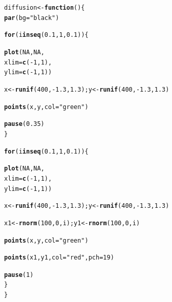 \documentclass[11pt, a4paper]{article}\usepackage[]{graphicx}\usepackage[]{xcolor}
\makeatletter
\newcommand{\hlnum}[1]{\textcolor[rgb]{0.686,0.059,0.569}{#1}}%
\newcommand{\hlsng}[1]{\textcolor[rgb]{0.192,0.494,0.8}{#1}}%
\newcommand{\hlopt}[1]{\textcolor[rgb]{0,0,0}{#1}}%
\newcommand{\hldef}[1]{\textcolor[rgb]{0.345,0.345,0.345}{#1}}%
\newcommand{\hlkwa}[1]{\textcolor[rgb]{0.161,0.373,0.58}{\textbf{#1}}}%
\newcommand{\hlkwb}[1]{\textcolor[rgb]{0.69,0.353,0.396}{#1}}%
\newcommand{\hlkwc}[1]{\textcolor[rgb]{0.333,0.667,0.333}{#1}}%
\newcommand{\hlkwd}[1]{\textcolor[rgb]{0.737,0.353,0.396}{\textbf{#1}}}%
\newenvironment{kframe}{%
 \def\at@end@of@kframe{}%
 \ifinner\ifhmode%
  \def\at@end@of@kframe{\end{minipage}}%
  \begin{minipage}{\columnwidth}%
 \fi\fi%
 \def\FrameCommand##1{\hskip\@totalleftmargin \hskip-\fboxsep
 \colorbox{shadecolor}{##1}\hskip-\fboxsep
     \hskip-\linewidth \hskip-\@totalleftmargin \hskip\columnwidth}%
 \MakeFramed {\advance\hsize-\width
   \@totalleftmargin\z@ \linewidth\hsize
   \@setminipage}}%
 {\par\unskip\endMakeFramed%
 \at@end@of@kframe}
\newenvironment{knitrout}{}{} %
\makeatother
\begin{document}
\begin{knitrout}\footnotesize
{}\color{fgcolor}\begin{kframe}
\begin{alltt}
\hldef{diffusion} \hlkwb{<-} \hlkwa{function}\hldef{()\{}
  \hlkwd{par}\hldef{(}\hlkwc{bg} \hldef{=} \hlsng{"black"}\hldef{)}

  \hlkwa{for}\hldef{(i} \hlkwa{in} \hlkwd{seq}\hldef{(}\hlnum{0.1}\hldef{,} \hlnum{1}\hldef{,} \hlnum{0.1}\hldef{))\{}

    \hlkwd{plot}\hldef{(}\hlnum{NA}\hldef{,} \hlnum{NA}\hldef{,}
         \hlkwc{xlim} \hldef{=} \hlkwd{c}\hldef{(}\hlopt{-}\hlnum{1}\hldef{,} \hlnum{1}\hldef{),}
         \hlkwc{ylim} \hldef{=} \hlkwd{c}\hldef{(}\hlopt{-}\hlnum{1}\hldef{,} \hlnum{1}\hldef{))}

    \hldef{x} \hlkwb{<-} \hlkwd{runif}\hldef{(}\hlnum{400}\hldef{,} \hlopt{-}\hlnum{1.3}\hldef{,} \hlnum{1.3}\hldef{); y} \hlkwb{<-} \hlkwd{runif}\hldef{(}\hlnum{400}\hldef{,} \hlopt{-}\hlnum{1.3}\hldef{,} \hlnum{1.3}\hldef{)}

    \hlkwd{points}\hldef{(x, y,} \hlkwc{col} \hldef{=} \hlsng{"green"}\hldef{)}

    \hlkwd{pause}\hldef{(}\hlnum{0.35}\hldef{)}
  \hldef{\}}

  \hlkwa{for}\hldef{(i} \hlkwa{in} \hlkwd{seq}\hldef{(}\hlnum{0.1}\hldef{,} \hlnum{1}\hldef{,} \hlnum{0.1}\hldef{))\{}

    \hlkwd{plot}\hldef{(}\hlnum{NA}\hldef{,} \hlnum{NA}\hldef{,}
         \hlkwc{xlim} \hldef{=} \hlkwd{c}\hldef{(}\hlopt{-}\hlnum{1}\hldef{,} \hlnum{1}\hldef{),}
         \hlkwc{ylim} \hldef{=} \hlkwd{c}\hldef{(}\hlopt{-}\hlnum{1}\hldef{,} \hlnum{1}\hldef{))}

    \hldef{x} \hlkwb{<-} \hlkwd{runif}\hldef{(}\hlnum{400}\hldef{,} \hlopt{-}\hlnum{1.3}\hldef{,} \hlnum{1.3}\hldef{); y} \hlkwb{<-} \hlkwd{runif}\hldef{(}\hlnum{400}\hldef{,} \hlopt{-}\hlnum{1.3}\hldef{,} \hlnum{1.3}\hldef{)}

    \hldef{x1} \hlkwb{<-} \hlkwd{rnorm}\hldef{(}\hlnum{100}\hldef{,} \hlnum{0}\hldef{, i); y1} \hlkwb{<-} \hlkwd{rnorm}\hldef{(}\hlnum{100}\hldef{,} \hlnum{0}\hldef{, i)}

    \hlkwd{points}\hldef{(x, y,} \hlkwc{col} \hldef{=} \hlsng{"green"}\hldef{)}

    \hlkwd{points}\hldef{(x1, y1,} \hlkwc{col} \hldef{=} \hlsng{"red"}\hldef{,} \hlkwc{pch} \hldef{=} \hlnum{19}\hldef{)}

    \hlkwd{pause}\hldef{(}\hlnum{1}\hldef{)}
  \hldef{\}}
\hldef{\}}
\end{alltt}
\end{kframe}
\end{knitrout}
\end{document}
